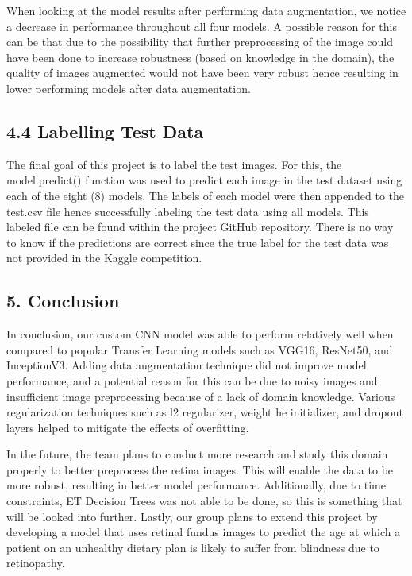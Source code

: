 \documentclass[
]{article}
\begin{document}
When looking at the model results after performing data augmentation, we
notice a decrease in performance throughout all four models. A possible
reason for this can be that due to the possibility that further
preprocessing of the image could have been done to increase robustness
(based on knowledge in the domain), the quality of images augmented
would not have been very robust hence resulting in lower performing
models after data augmentation.

\hypertarget{labelling-test-data}{%
\subsection{\texorpdfstring{\textbf{4.4 Labelling Test
Data}}{4.4 Labelling Test Data}}\label{labelling-test-data}}

The final goal of this project is to label the test images. For this,
the model.predict() function was used to predict each image in the test
dataset using each of the eight (8) models. The labels of each model
were then appended to the test.csv file hence successfully labeling the
test data using all models. This labeled file can be found within the
project GitHub repository. There is no way to know if the predictions
are correct since the true label for the test data was not provided in
the Kaggle competition.

\hypertarget{conclusion}{%
\subsection{\texorpdfstring{\textbf{5. Conclusion}}{Conclusion}}\label{conclusion}}

In conclusion, our custom CNN model was able to perform relatively well
when compared to popular Transfer Learning models such as VGG16,
ResNet50, and InceptionV3. Adding data augmentation technique did not
improve model performance, and a potential reason for this can be due to
noisy images and insufficient image preprocessing because of a lack of
domain knowledge. Various regularization techniques such as l2
regularizer, weight he initializer, and dropout layers helped to
mitigate the effects of overfitting.

In the future, the team plans to conduct more research and study this
domain properly to better preprocess the retina images. This will enable
the data to be more robust, resulting in better model performance.
Additionally, due to time constraints, ET Decision Trees was not able to
be done, so this is something that will be looked into further. Lastly,
our group plans to extend this project by developing a model that uses
retinal fundus images to predict the age at which a patient on an
unhealthy dietary plan is likely to suffer from blindness due to
retinopathy.
\end{document}
